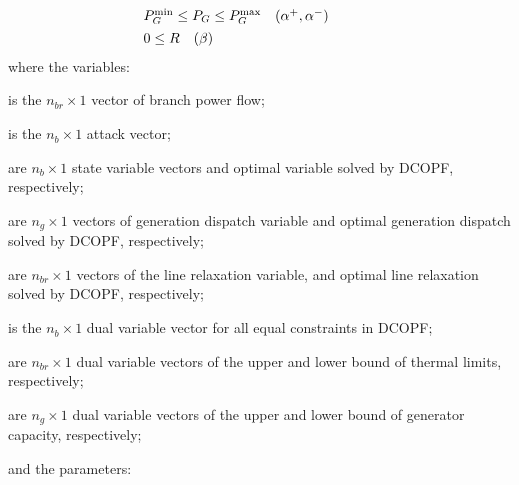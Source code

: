 \documentclass[twocolumn,english,final,journal]{IEEEtran}
\theoremstyle{plain}
\theoremstyle{definition}
\begin{document}
\begin{align}
 & \begin{array}{cc}
\negthickspace\negthickspace\negthickspace\negthickspace\negthickspace\negthickspace\negthickspace\negthickspace\negthickspace\negthickspace\negthickspace\negthickspace{P_{G}^{\min}\leq P_{G}\leq P_{G}^{\max}} & {(\alpha^{+},\alpha^{-})}\end{array}\label{eq:DCOPF4}\\
 & \begin{array}{cc}
\negthickspace\negthickspace\negthickspace\negthickspace\negthickspace\negthickspace\negthickspace\negthickspace\negthickspace\negthickspace\negthickspace\negthickspace{0\leq R} & {(\beta)}\end{array}\label{eq:DCOPF5}
\end{align}
where the variables:
\begin{description}[leftmargin=1.8cm,style=multiline]
\item[$P$] is the $n_{br}\times1$ vector of branch power flow;
\item[$c$] is the $n_{b}\times1$ attack vector;
\item[$\theta,\theta^{\star}$] are $n_{b}\times1$ state variable vectors and optimal variable solved
by DCOPF, respectively;
\item[$P_{G},P_{G}^{\star}$] are $n_{g}\times1$ vectors of generation dispatch variable and optimal
generation dispatch solved by DCOPF, respectively;
\item[$R,R^{\star}$] are $n_{br}\times1$ vectors of the line relaxation variable, and
optimal line relaxation solved by DCOPF, respectively;
\item[$\upsilon$] is the $n_{b}\times1$ dual variable vector for all equal constraints
in DCOPF;
\item[$\lambda^{+},\lambda^{-}$] are $n_{br}\times1$ dual variable vectors of the upper and lower
bound of thermal limits, respectively;
\item[$\alpha^{+},\alpha^{-}$] are $n_{g}\times1$ dual variable vectors of the upper and lower bound
of generator capacity, respectively;
\end{description}
and the parameters:
\end{document}
